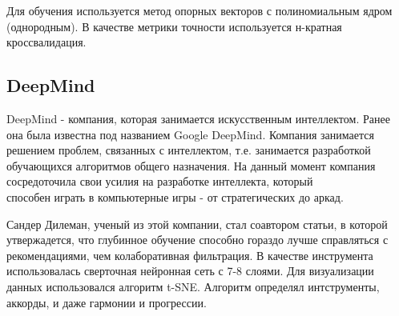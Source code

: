 Для обучения используется метод опорных векторов с полиномиальным ядром (однородным). В качестве метрики точности используется н-крат\-ная кроссвалидация.

\subsection{DeepMind}
\label{sec:analogues:deepmind}
DeepMind - компания, которая занимается искусственным интеллектом. Ранее она была известна под названием Google DeepMind. Компания занимается решением проблем, связанных с интеллектом, т.е. занимается разработкой обучающихся алгоритмов общего назначения. На данный момент компания сосредоточила свои усилия на разработке интеллекта, который \\способен играть в компьютерные игры - от стратегических до аркад.

Сандер Дилеман, ученый из этой компании, стал соавтором статьи\cite{deepcontent}, в которой утвержадется, что глубинное обучение способно гораздо лучше справляться с рекомендациями, чем колаборативная фильтрация. В качестве инструмента использовалась сверточная нейронная сеть с 7-8 слоями. Для визуализации данных использовался алгоритм t-SNE. Алгоритм определял интструменты, аккорды, и даже гармонии и прогрессии.
